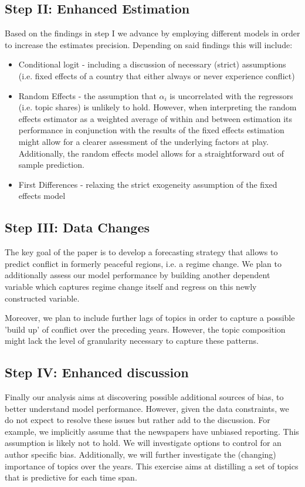 \subsection{Step II: Enhanced Estimation}
Based on the findings in step I we advance by employing different models in order to increase the estimates precision. Depending on said findings this will include: 
\begin{itemize}
    \item Conditional logit - including a discussion of necessary (strict) assumptions (i.e. fixed effects of a country that either always or never experience conflict)
    \item Random Effects - the assumption that $\alpha_i$ is uncorrelated with the regressors (i.e. topic shares) is unlikely to hold. However, when interpreting the random effects estimator as a weighted average of within and between estimation its performance in conjunction with the results of the fixed effects estimation might allow for a clearer assessment of the underlying factors at play. Additionally, the random effects model allows for a straightforward out of sample prediction.
    \item First Differences - relaxing the strict exogeneity assumption of the fixed effects model
\end{itemize}

\subsection{Step III: Data Changes}
The key goal of the paper is to develop a forecasting strategy that allows to predict conflict in formerly peaceful regions, i.e. a regime change. We plan to additionally assess our model performance by building another dependent variable which captures regime change itself and regress on this newly constructed variable.


Moreover, we plan to include further lags of topics in order to capture a possible 'build up' of conflict over the preceding years. However, the topic composition might lack the level of granularity necessary to capture these patterns. 

\subsection{Step IV: Enhanced discussion}
Finally our analysis aims at discovering possible additional sources of bias, to better understand model performance. However, given the data constraints, we do not expect to resolve these issues but rather add to the discussion. 
For example, we implicitly assume that the newspapers have unbiased reporting. This assumption is likely not to hold. We will investigate options to control for an author specific bias. 
Additionally, we will further investigate the (changing) importance of topics over the years. This exercise aims at distilling a set of topics that is predictive for each time span.



